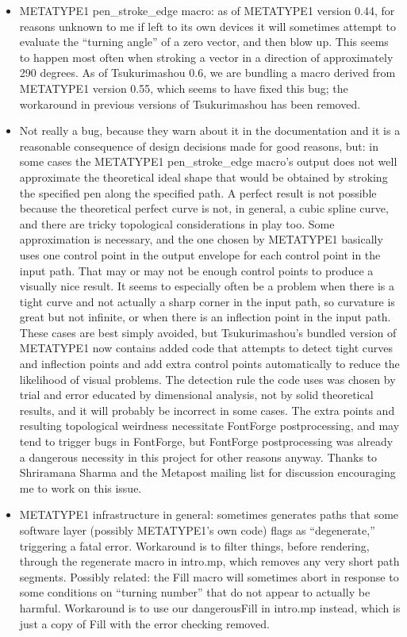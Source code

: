 \documentclass[14pt]{extarticle}
\begin{document}
\begin{itemize}
  \item METATYPE1 pen\_stroke\_edge macro: as of METATYPE1 version
    0.44, for reasons unknown to me if left to its own devices it will
    sometimes attempt to evaluate the ``turning angle'' of a zero vector,
    and then blow up.  This seems to happen most often when stroking a
    vector in a direction of approximately 290 degrees.  As of Tsukurimashou
    0.6, we are bundling a macro derived from METATYPE1 version 0.55, which
    seems to have fixed this bug; the workaround in previous versions of
    Tsukurimashou has been removed.

  \item Not really a bug, because they warn about it in the documentation
    and it is a reasonable consequence of design decisions made for good
    reasons, but: in some cases the METATYPE1 pen\_stroke\_edge macro's
    output does not well approximate the theoretical ideal shape that would
    be obtained by stroking the specified pen along the specified path.  A
    perfect result is not possible because the theoretical perfect curve is
    not, in general, a cubic spline curve, and there are tricky topological
    considerations in play too.  Some approximation is necessary, and the
    one chosen by METATYPE1 basically uses one control point in the output
    envelope for each control point in the input path.  That may or may not
    be enough control points to produce a visually nice result.  It seems to
    especially often be a problem when there is a tight curve and not
    actually a sharp corner in the input path, so curvature is great but not
    infinite, or when there is an inflection point in the input path.  These
    cases are best simply avoided, but Tsukurimashou's bundled version of
    METATYPE1 now contains added code that attempts to detect tight curves
    and inflection points and add extra control points automatically to
    reduce the likelihood of visual problems.  The detection rule the code
    uses was chosen by trial and error educated by dimensional analysis, not
    by solid theoretical results, and it will probably be incorrect in some
    cases.  The extra points and resulting topological weirdness necessitate
    FontForge postprocessing, and may tend to trigger bugs in FontForge, but
    FontForge postprocessing was already a dangerous necessity in this
    project for other reasons anyway.  Thanks to Shriramana Sharma and the
    Metapost mailing list for discussion encouraging me to work on this
    issue.

  \item METATYPE1 infrastructure in general: sometimes generates paths that
    some software layer (possibly METATYPE1's own code) flags as
    ``degenerate,'' triggering a fatal error.  Workaround is to filter
    things, before rendering, through the regenerate macro in intro.mp,
    which removes any very short path segments.  Possibly related: the Fill
    macro will sometimes abort in response to some conditions on ``turning
    number'' that do not appear to actually be harmful.  Workaround is to
    use our dangerousFill in intro.mp instead, which is just a copy of Fill
    with the error checking removed.


\end{itemize}
\end{document}
